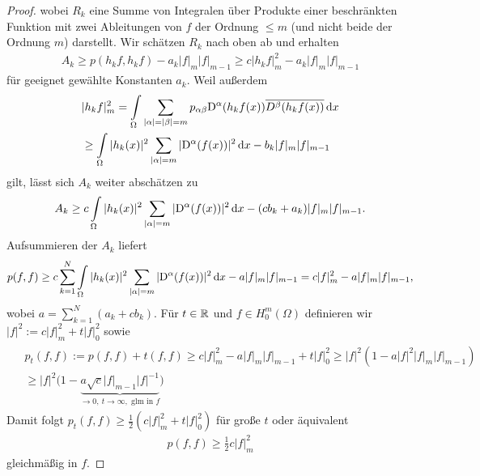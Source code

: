 \begin{proof}
wobei $R_k$ eine Summe von Integralen über Produkte einer beschränkten Funktion mit zwei Ableitungen von $f$ der Ordnung $\le m$ (und nicht beide der Ordnung $m$) darstellt.
Wir schätzen $R_k$ nach oben ab und erhalten
\begin{align}
 A_k \ge p(h_kf,h_kf)-a_k\vert f\vert_m\vert f\vert_{m-1} \ge c \vert h_kf\vert_m^2-a_k\vert f\vert_m\vert f\vert_{m-1}
\end{align}
für geeignet gewählte Konstanten $a_k$. Weil außerdem
\begin{align}
\begin{split}
	&\vert h_kf\vert_m^2 = \int\limits_\Omega \sum\limits_{\vert\alpha\vert=\vert\beta\vert=m}p_{\alpha\beta}\mathrm D^\alpha(h_kf(x))\overline{D^\beta(h_kf(x))}\,\mathrm d x \\
	&\ge \int\limits_\Omega \vert h_k(x)\vert^2 \sum\limits_{\vert\alpha\vert=m}\vert \mathrm D^\alpha (f(x))\vert^2 \,\mathrm d x-b_k \vert f\vert_m\vert f\vert_{m-1}
	\end{split}
\end{align}
gilt, lässt sich $A_k$ weiter abschätzen zu
\begin{align}
	A_k \ge c\int\limits_\Omega \vert h_k(x)\vert^2 \sum\limits_{\vert\alpha\vert=m}\vert \mathrm D^\alpha (f(x))\vert^2 \,\mathrm d x-(cb_k+a_k)\vert f\vert_m\vert f\vert_{m-1}.
\end{align}
Aufsummieren der $A_k$ liefert
\begin{align}
	p(f,f) \ge c \sum\limits_{k=1}^N \int\limits_\Omega\vert h_k(x)\vert^2  \sum\limits_{\vert\alpha\vert=m}\vert \mathrm D^\alpha (f(x))\vert^2 \,\mathrm d x-a\vert f\vert_m\vert f\vert_{m-1} =c\vert f\vert_m^2 -a \vert f\vert_m\vert f\vert_{m-1},
\end{align}
wobei $a= \sum_{k=1}^N (a_k+cb_k)$. Für $t\in \mathbb R$ und $f\in H_0^m(\Omega)$ definieren wir $\vert f\vert^2:= c \vert f\vert_m^2+t\vert f\vert_0^2$ sowie
\begin{align}
\begin{split}
	&p_t(f,f) := p(f,f)+t(f,f) \ge c\vert f\vert_m^2-a\vert f\vert_m\vert f\vert_{m-1}+t\vert f\vert_0^2 \ge \vert f\vert^2\left(1-a\vert f\vert^2\vert f\vert_m\vert f\vert_{m-1}\right)\\
	& \ge \vert f\vert^2\big(1-\underbrace{a \sqrt{c}\vert f\vert_{m-1}\vert f\vert^{-1}}_{\rightarrow 0, \ t \rightarrow \infty, \text{ glm in } f}\big)
	\end{split}
\end{align}
Damit folgt $p_t(f,f) \ge \frac{1}{2}\left(c\vert f\vert_m^2+t\vert f\vert_0^2\right)$ für große $t$ oder äquivalent
\begin{align}
	p(f,f) \ge \frac{1}{2}c\vert f\vert_m^2
\end{align}
gleichmäßig in $f$. 
\end{proof}


